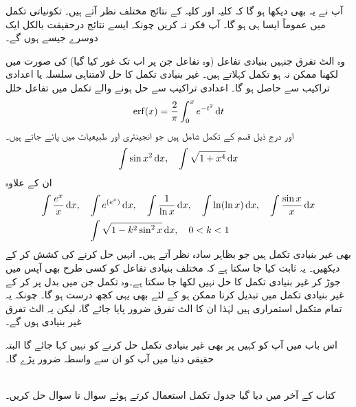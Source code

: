 آپ نے یہ بھی دیکھا ہو گا کہ کلیہ  اور کلیہ  کے نتائج مختلف نظر آتے ہیں۔ تکونیاتی تکمل میں عموماً ایسا ہی ہو گا۔ آپ فکر نہ کریں چونکہ ایسے نتائج درحقیقت بالکل ایک دوسرے جیسے ہوں گے۔

وہ الٹ تفرق جنہیں بنیادی تفاعل (وہ تفاعل جن پر اب تک غور کیا گیا) کی صورت میں لکھنا ممکن نہ ہو  تکمل کہلاتے ہیں۔ غیر بنیادی تکمل کا حل لامتناہی سلسلہ  یا اعدادی تراکیب سے حاصل ہو گا۔ اعدادی تراکیب سے حل ہونے والے تکمل میں تفاعل خلل
\begin{align*}
\erf(x)=\frac{2}{\pi}\int_0^x e^{-t^2}\dif t
\end{align*}
اور درج ذیل قسم کے تکمل شامل ہیں جو انجینئری اور طبیعیات میں پائے جاتے ہیں۔
\begin{align*}
\int\sin x^2\dif x,\quad \int \sqrt{1+x^4}\dif x
\end{align*}
ان کے علاوہ
\begin{align*}
\int\frac{e^x}{x}\dif x,\quad &\int e^{(e^x)}\dif x,\quad \int\frac{1}{\ln x}\dif x,\quad \int \ln(\ln x)\dif x,\quad \int\frac{\sin x}{x}\dif x\\
&\int \sqrt{1-k^2\sin^2x}\dif x,\quad 0<k<1
\end{align*}
بھی غیر بنیادی تکمل ہیں جو بظاہر سادہ نظر آتے ہیں۔ انہیں حل کرنے کی کشش کر کے دیکھیں۔ یہ ثابت کیا جا سکتا ہے کہ مختلف بنیادی تفاعل کو کسی طرح بھی آپس میں جوڑ کر غیر بنیادی تکمل کا حل نہیں لکھا جا سکتا ہے۔وہ تکمل جن میں بدل پر کر کے غیر بنیادی تکمل میں تبدیل کرنا ممکن ہو کے لئے بھی یہی کچھ درست ہو گا۔ چونکہ یہ تمام متکمل استمراری ہیں لہٰذا ان کا الٹ تفرق ضرور پایا جائے گا، لیکن یہ الٹ تفرق غیر بنیادی ہوں گے۔ 

اس باب میں آپ کو کہیں پر بھی غیر بنیادی تکمل حل کرنے کو نہیں کہا جائے گا البتہ حقیقی دنیا میں آپ کو ان سے واسطہ ضرور پڑے گا۔

\\
کتاب کے آخر میں دیا گیا جدول تکمل استعمال کرتے ہوئے سوال  تا سوال  حل کریں۔


